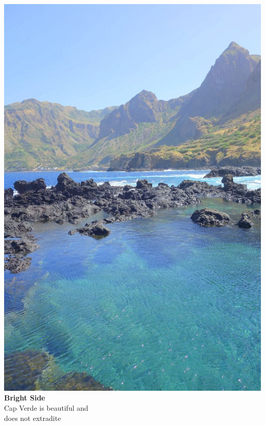 \begin{frame}[plain]
\vspace{-82pt}
\hspace*{-32pt}
    \includegraphics[height=\paperheight]{img/figures/cap_verde}
\vspace{-9cm}
\hspace*{5.5cm} \textcolor{isered}{\Large \textbf{Bright Side}}\\[0.6\baselineskip]
\hspace*{5.5cm} Cap Verde is beautiful and \\[0.2\baselineskip]
\hspace*{5.5cm} does not extradite
\vfill
\end{frame}


